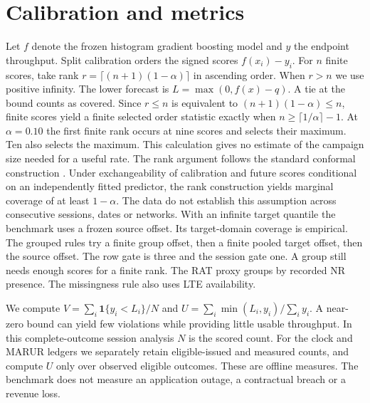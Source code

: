 \documentclass[journal,onecolumn,10pt]{IEEEtran}
\begin{document}
\section{Calibration and metrics}
Let $f$ denote the frozen histogram gradient boosting model and $y$ the endpoint throughput. Split calibration orders the signed scores $f(x_i)-y_i$. For $n$ finite scores, take rank $r=\lceil(n+1)(1-\alpha)\rceil$ in ascending order. When $r>n$ we use positive infinity. The lower forecast is $L=\max(0,f(x)-q)$. A tie at the bound counts as covered. Since $r\le n$ is equivalent to $(n+1)(1-\alpha)\le n$, finite scores yield a finite selected order statistic exactly when $n\geq\lceil1/\alpha\rceil-1$. At $\alpha=0.10$ the first finite rank occurs at nine scores and selects their maximum. Ten also selects the maximum. This calculation gives no estimate of the campaign size needed for a useful rate.
The rank argument follows the standard conformal construction \cite{vovk2005algorithmic}. Under exchangeability of calibration and future scores conditional on an independently fitted predictor, the rank construction yields marginal coverage of at least $1-\alpha$. The data do not establish this assumption across consecutive sessions, dates or networks. With an infinite target quantile the benchmark uses a frozen source offset. Its target-domain coverage is empirical. The grouped rules try a finite group offset, then a finite pooled target offset, then the source offset. The row gate is three and the session gate one. A group still needs enough scores for a finite rank. The RAT proxy groups by recorded NR presence. The missingness rule also uses LTE availability.

We compute $V=\sum_i\mathbf{1}\{y_i<L_i\}/N$ and $U=\sum_i\min(L_i,y_i)/\sum_i y_i$. A near-zero bound can yield few violations while providing little usable throughput. In this complete-outcome session analysis $N$ is the scored count. For the clock and MARUR ledgers we separately retain eligible-issued and measured counts, and compute $U$ only over observed eligible outcomes. These are offline measures. The benchmark does not measure an application outage, a contractual breach or a revenue loss.


\end{document}
